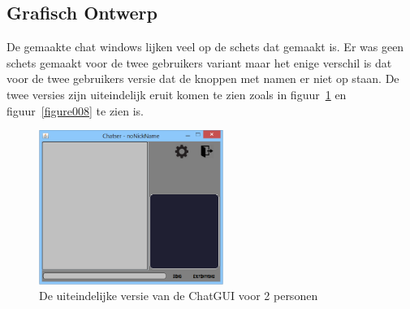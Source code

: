 \documentclass[12pt]{article}
\begin{document}
\subsection{Grafisch Ontwerp}
De gemaakte chat windows lijken veel op de schets dat gemaakt is. Er was geen schets gemaakt voor de twee gebruikers variant maar het enige verschil is dat voor de twee gebruikers versie dat de knoppen met namen er niet op staan. De twee versies zijn uiteindelijk eruit komen te zien zoals in figuur~\ref{figure007} en figuur~\ref{figure008} te zien is.
\begin{figure}[ht]
\begin{center}
\includegraphics[width = 60mm]{chatser2}
\caption{De uiteindelijke versie van de ChatGUI voor 2 personen}
\label{figure007}
\end{center}
\end{figure}
\end{document}
